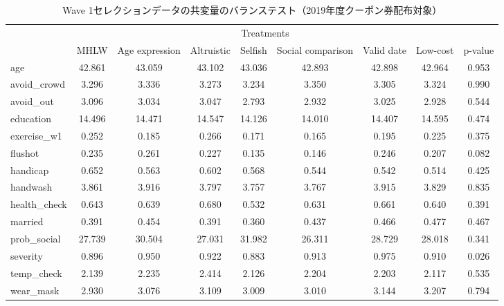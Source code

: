 \documentclass[
  11pt,
  a4paper,
]{article}
\begin{document}
\begin{table}

\caption{\label{tab:show-act-coupon1-balance}Wave 1セレクションデータの共変量のバランステスト（2019年度クーポン券配布対象）}
\centering
\begin{tabular}[t]{lcccccccc}
\toprule
\multicolumn{1}{c}{ } & \multicolumn{7}{c}{Treatments} & \multicolumn{1}{c}{ } \\
\cmidrule(l{3pt}r{3pt}){2-8}
  & MHLW & Age expression & Altruistic & Selfish & Social comparison & Valid date & Low-cost & p-value\\
\midrule
age & 42.861 & 43.059 & 43.102 & 43.036 & 42.893 & 42.898 & 42.964 & 0.953\\
avoid\_crowd & 3.296 & 3.336 & 3.273 & 3.234 & 3.350 & 3.305 & 3.324 & 0.990\\
avoid\_out & 3.096 & 3.034 & 3.047 & 2.793 & 2.932 & 3.025 & 2.928 & 0.544\\
education & 14.496 & 14.471 & 14.547 & 14.126 & 14.010 & 14.407 & 14.595 & 0.474\\
exercise\_w1 & 0.252 & 0.185 & 0.266 & 0.171 & 0.165 & 0.195 & 0.225 & 0.375\\
flushot & 0.235 & 0.261 & 0.227 & 0.135 & 0.146 & 0.246 & 0.207 & 0.082\\
handicap & 0.652 & 0.563 & 0.602 & 0.568 & 0.544 & 0.542 & 0.514 & 0.425\\
handwash & 3.861 & 3.916 & 3.797 & 3.757 & 3.767 & 3.915 & 3.829 & 0.835\\
health\_check & 0.643 & 0.639 & 0.680 & 0.532 & 0.631 & 0.661 & 0.640 & 0.391\\
married & 0.391 & 0.454 & 0.391 & 0.360 & 0.437 & 0.466 & 0.477 & 0.467\\
prob\_social & 27.739 & 30.504 & 27.031 & 31.982 & 26.311 & 28.729 & 28.018 & 0.341\\
severity & 0.896 & 0.950 & 0.922 & 0.883 & 0.913 & 0.975 & 0.910 & 0.026\\
temp\_check & 2.139 & 2.235 & 2.414 & 2.126 & 2.204 & 2.203 & 2.117 & 0.535\\
wear\_mask & 2.930 & 3.076 & 3.109 & 3.009 & 3.010 & 3.144 & 3.207 & 0.794\\
\bottomrule
\end{tabular}
\end{table}
\end{document}

